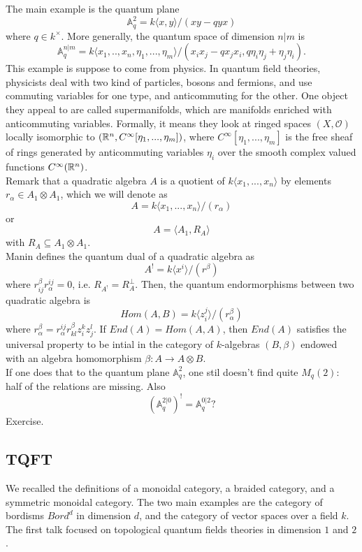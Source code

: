 The main example is the quantum plane
\[\mathbb A_q^{2} = k\langle x,y \rangle / (xy -qyx)\]
where $q\in k^\times$. More generally, the quantum space of dimension $n|m$ is
\[ \mathbb A_q^{n|m} = k\langle x_1,.. ,x_n , \eta_1,...,\eta_m \rangle / (x_i x_j - q x_j x_i , q \eta_i \eta_j +  \eta_j \eta_i).\]
This example is suppose to come from physics. In quantum field theories, physicists deal with two kind of particles, bosons and fermions, and use commuting variables for one type, and anticommuting for the other. One object they appeal to are called supermanifolds, which are manifolds enriched with anticommuting variables. Formally, it means they look at ringed spaces $(X,\mathcal O)$ locally isomorphic to $(\mathbb R^n, C^\infty [\eta_1,...,\eta_m])$, where $C^\infty [\eta_1,...,\eta_m]$ is the free sheaf of rings generated by anticommuting variables $\eta_i$ over the smooth complex valued functions $C^\infty(\mathbb R^n)$.\\

Remark that a quadratic algebra $A$ is a quotient of $k\langle x_1,... ,x_n\rangle$ by elements $r_\alpha \in A_1 \otimes A_1$, which we will denote as 
\[A= k\langle x_1,... ,x_n\rangle / (r_\alpha)\]
or \[A= \langle A_1, R_A\rangle\]
with $R_A \subseteq A_1 \otimes A_1$.\\

Manin defines the quantum dual of a quadratic algebra as
\[A^{!} = k\langle x^i\rangle / (r^\beta)\]
where $r^\beta_{ij}r^{ij}_\alpha = 0$, i.e. $R_{A^!}=R_{A}^\perp$. Then, the quantum endormorphisms between two quadratic algebra is
\[Hom(A,B) =k\langle z^j_i\rangle / (r_\alpha^\beta)\]
where $r_\alpha^\beta = r_\alpha^{ij}r^\beta_{kl} z_i^k z_j^l$. If $End(A)= Hom(A,A)$, then $End(A)$ satisfies the universal property to be intial in the category of $k$-algebras $(B,\beta)$ endowed with an algebra homomorphism $\beta: A \rightarrow A\otimes B$.\\ 

If one does that to the quantum plane $\mathbb A_q^2$, one stil doesn't find quite $M_q(2)$: half of the relations are missing. Also 
\[(\mathbb A_q^{2|0})^! = \mathbb A_q^{0|2}?\] Exercise.

\subsection{TQFT}

We recalled the definitions of a monoidal category, a braided category, and a symmetric monoidal category. The two main examples are the category of bordisms $Bord^d$ in dimension $d$, and the category of vector spaces over a field $k$. The first talk focused on topological quantum fields theories in dimension $1$ and $2$.


